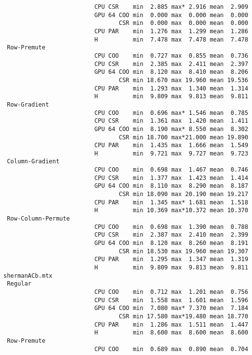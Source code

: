 \begin{verbatim}
                          CPU CSR    min  2.885 max* 2.916 mean  2.909
                          GPU 64 COO min  0.000 max  0.000 mean  0.000
                                 CSR min  0.000 max  0.000 mean  0.000
                          CPU PAR    min  1.276 max  1.299 mean  1.286
                          H          min  7.478 max  7.478 mean  7.478
 Row-Premute
                          CPU COO    min  0.727 max  0.855 mean  0.736
                          CPU CSR    min  2.385 max  2.411 mean  2.397
                          GPU 64 COO min  8.120 max  8.410 mean  8.206
                                 CSR min 18.670 max 19.960 mean 19.536
                          CPU PAR    min  1.293 max  1.340 mean  1.314
                          H          min  9.809 max  9.813 mean  9.811
 Row-Gradient
                          CPU COO    min  0.696 max* 1.546 mean  0.785
                          CPU CSR    min  1.361 max  1.420 mean  1.411
                          GPU 64 COO min  8.190 max* 8.550 mean  8.302
                                 CSR min 18.700 max*21.000 mean 19.890
                          CPU PAR    min  1.435 max  1.666 mean  1.549
                          H          min  9.721 max  9.727 mean  9.723
 Column-Gradient
                          CPU COO    min  0.698 max  1.467 mean  0.746
                          CPU CSR    min  1.377 max  1.423 mean  1.414
                          GPU 64 COO min  8.110 max  8.290 mean  8.187
                                 CSR min 18.090 max 20.190 mean 19.217
                          CPU PAR    min  1.345 max* 1.681 mean  1.518
                          H          min 10.369 max*10.372 mean 10.370
 Row-Column-Permute
                          CPU COO    min  0.698 max  1.390 mean  0.788
                          CPU CSR    min  2.387 max  2.410 mean  2.399
                          GPU 64 COO min  8.120 max  8.260 mean  8.191
                                 CSR min 18.530 max 19.960 mean 19.307
                          CPU PAR    min  1.295 max  1.347 mean  1.319
                          H          min  9.809 max  9.813 mean  9.811
shermanACb.mtx
 Regular
                          CPU COO    min  0.712 max  1.201 mean  0.756
                          CPU CSR    min  1.558 max  1.601 mean  1.596
                          GPU 64 COO min  7.080 max* 7.370 mean  7.184
                                 CSR min 17.580 max*19.480 mean 18.770
                          CPU PAR    min  1.286 max  1.511 mean  1.447
                          H          min  8.600 max  8.600 mean  8.600
 Row-Premute
                          CPU COO    min  0.689 max  0.890 mean  0.704

\end{verbatim}
